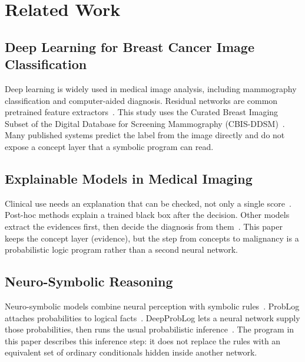 \section{Related Work}
\label{sec:related}

\subsection{Deep Learning for Breast Cancer Image Classification}
Deep learning is widely used in medical image analysis, including mammography classification and computer-aided diagnosis. Residual networks are common pretrained feature extractors~\cite{he2016resnet}. This study uses the Curated Breast Imaging Subset of the Digital Database for Screening Mammography (CBIS-DDSM)~\cite{lee2017cbis}. Many published systems predict the label from the image directly and do not expose a concept layer that a symbolic program can read.

\subsection{Explainable Models in Medical Imaging}
Clinical use needs an explanation that can be checked, not only a single score~\cite{vandervelden2022xai,rudin2019stop}. Post-hoc methods explain a trained black box after the decision.  Other models extract the evidences first, then decide the diagnosis from them~\cite{koh2020concept}. This paper keeps the concept layer (evidence), but the step from concepts to malignancy is a probabilistic logic program rather than a second neural network.

\subsection{Neuro-Symbolic Reasoning}
Neuro-symbolic models combine neural perception with symbolic rules~\cite{garcez2023neurosymbolic}. ProbLog attaches probabilities to logical facts~\cite{deraedt2007problog}. DeepProbLog lets a neural network supply those probabilities, then runs the usual probabilistic inference~\cite{manhaeve2021neural}. The program in this paper describes this inference step: it does not replace the rules with an equivalent set of ordinary conditionals hidden inside another network.
